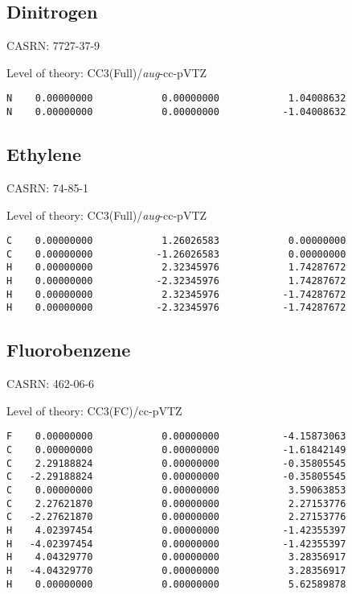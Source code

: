 \documentclass[journal=jctcce,manuscript=article,layout=traditional]{achemso}
\newcommand{\TZ}{cc-pVTZ}
\newcommand{\AVTZ}{\emph{aug}-cc-pVTZ}
\begin{document}
\subsection{Dinitrogen}

CASRN: 7727-37-9

\begin{singlespace}
Level of theory: CC3(Full)/{\AVTZ}
\begin{verbatim}
N    0.00000000            0.00000000            1.04008632
N    0.00000000            0.00000000           -1.04008632
\end{verbatim}
\end{singlespace}

\subsection{Ethylene}

CASRN: 74-85-1

\begin{singlespace}
\noindent Level of theory: CC3(Full)/{\AVTZ}
\begin{verbatim}
C    0.00000000            1.26026583            0.00000000
C    0.00000000           -1.26026583            0.00000000
H    0.00000000            2.32345976            1.74287672
H    0.00000000           -2.32345976            1.74287672
H    0.00000000            2.32345976           -1.74287672
H    0.00000000           -2.32345976           -1.74287672
\end{verbatim}
\end{singlespace}


\subsection{Fluorobenzene}

CASRN: 462-06-6

\begin{singlespace}
\noindent Level of theory: CC3(FC)/{\TZ}
\begin{verbatim}
F    0.00000000            0.00000000           -4.15873063
C    0.00000000            0.00000000           -1.61842149
C    2.29188824            0.00000000           -0.35805545
C   -2.29188824            0.00000000           -0.35805545
C    0.00000000            0.00000000            3.59063853
C    2.27621870            0.00000000            2.27153776
C   -2.27621870            0.00000000            2.27153776
H    4.02397454            0.00000000           -1.42355397
H   -4.02397454            0.00000000           -1.42355397
H    4.04329770            0.00000000            3.28356917
H   -4.04329770            0.00000000            3.28356917
H    0.00000000            0.00000000            5.62589878
\end{verbatim}
\end{singlespace}
\end{document}
